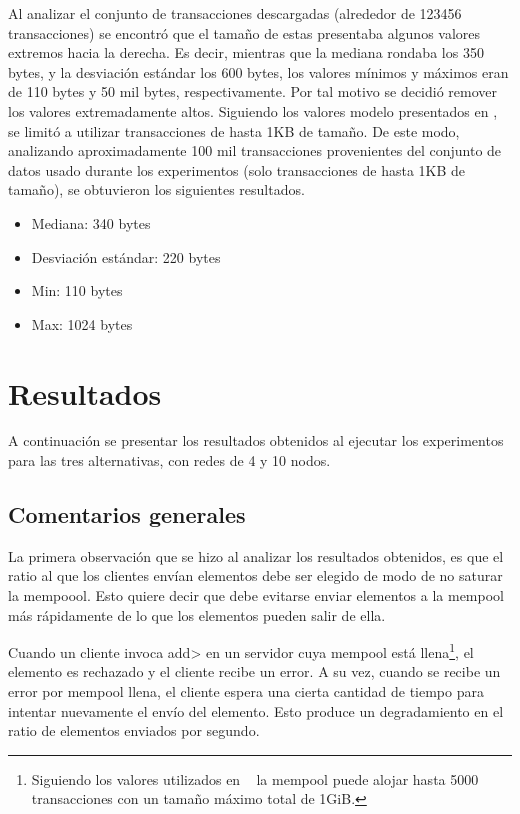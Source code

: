 %
Al analizar el conjunto de transacciones descargadas (alrededor de 123456 transacciones) se encontró que el tamaño de
estas presentaba algunos valores extremos hacia la derecha.
Es decir, mientras que la mediana rondaba los 350 bytes, y la desviación estándar los 600 bytes, los valores mínimos y máximos eran de
110 bytes y  50 mil bytes, respectivamente.
Por tal motivo se decidió remover los valores extremadamente altos.
Siguiendo los valores modelo presentados en \cite{tendermint.design}, se limitó a utilizar transacciones de hasta 1KB de tamaño.
De este modo, analizando aproximadamente 100 mil transacciones provenientes del conjunto de datos usado
durante los experimentos (solo transacciones de hasta 1KB de tamaño), se obtuvieron los siguientes resultados.
\begin{itemize}
	\item Mediana: 340 bytes
	\item Desviación estándar: 220 bytes
	\item Min: 110 bytes
	\item Max: 1024 bytes
\end{itemize}
%

\section{Resultados}

A continuación se presentar los resultados obtenidos al ejecutar los experimentos para las tres alternativas,
con redes de 4 y 10 nodos.

\subsection{Comentarios generales}

La primera observación que se hizo al analizar los resultados obtenidos, es que el ratio al que los clientes envían elementos
debe ser elegido de modo de no saturar la mempoool.
Esto quiere decir que debe evitarse enviar elementos a la mempool más rápidamente de lo que los elementos pueden salir de ella.

Cuando un cliente invoca \<add> en un servidor cuya mempool está llena\footnote{Siguiendo los valores utilizados en
~\cite{tendermint.design} la mempool puede alojar hasta 5000 transacciones con un tamaño máximo total de 1GiB.},
el elemento es rechazado y el cliente recibe un error.
A su vez, cuando se recibe un error por mempool llena, el cliente espera una cierta cantidad de tiempo para intentar
nuevamente el envío del elemento.
Esto produce un degradamiento en el ratio de elementos enviados por segundo.

